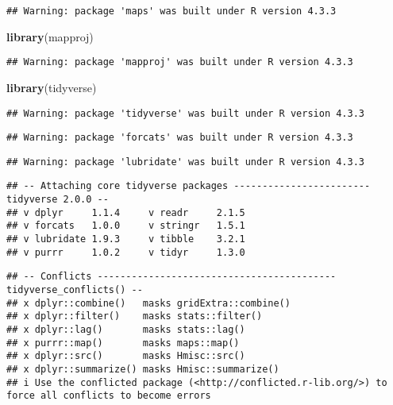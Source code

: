 \documentclass[
]{article}
\newenvironment{Shaded}{\begin{snugshade}}{\end{snugshade}}
\newcommand{\FunctionTok}[1]{\textcolor[rgb]{0.13,0.29,0.53}{\textbf{#1}}}
\newcommand{\NormalTok}[1]{#1}
\begin{document}
\begin{verbatim}
## Warning: package 'maps' was built under R version 4.3.3
\end{verbatim}

\begin{Shaded}
\begin{Highlighting}[]
\FunctionTok{library}\NormalTok{(mapproj)}
\end{Highlighting}
\end{Shaded}

\begin{verbatim}
## Warning: package 'mapproj' was built under R version 4.3.3
\end{verbatim}

\begin{Shaded}
\begin{Highlighting}[]
\FunctionTok{library}\NormalTok{(tidyverse)}
\end{Highlighting}
\end{Shaded}

\begin{verbatim}
## Warning: package 'tidyverse' was built under R version 4.3.3
\end{verbatim}

\begin{verbatim}
## Warning: package 'forcats' was built under R version 4.3.3
\end{verbatim}

\begin{verbatim}
## Warning: package 'lubridate' was built under R version 4.3.3
\end{verbatim}

\begin{verbatim}
## -- Attaching core tidyverse packages ------------------------ tidyverse 2.0.0 --
## v dplyr     1.1.4     v readr     2.1.5
## v forcats   1.0.0     v stringr   1.5.1
## v lubridate 1.9.3     v tibble    3.2.1
## v purrr     1.0.2     v tidyr     1.3.0
\end{verbatim}

\begin{verbatim}
## -- Conflicts ------------------------------------------ tidyverse_conflicts() --
## x dplyr::combine()   masks gridExtra::combine()
## x dplyr::filter()    masks stats::filter()
## x dplyr::lag()       masks stats::lag()
## x purrr::map()       masks maps::map()
## x dplyr::src()       masks Hmisc::src()
## x dplyr::summarize() masks Hmisc::summarize()
## i Use the conflicted package (<http://conflicted.r-lib.org/>) to force all conflicts to become errors
\end{verbatim}
\end{document}
